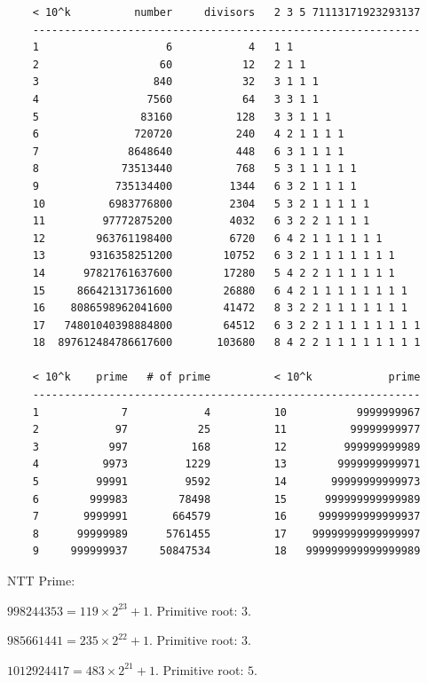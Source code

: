 \begin{verbatim}
	< 10^k          number     divisors   2 3 5 71113171923293137
	-------------------------------------------------------------
	1                    6            4   1 1
	2                   60           12   2 1 1
	3                  840           32   3 1 1 1
	4                 7560           64   3 3 1 1
	5                83160          128   3 3 1 1 1
	6               720720          240   4 2 1 1 1 1
	7              8648640          448   6 3 1 1 1 1
	8             73513440          768   5 3 1 1 1 1 1
	9            735134400         1344   6 3 2 1 1 1 1
	10          6983776800         2304   5 3 2 1 1 1 1 1
	11         97772875200         4032   6 3 2 2 1 1 1 1
	12        963761198400         6720   6 4 2 1 1 1 1 1 1
	13       9316358251200        10752   6 3 2 1 1 1 1 1 1 1
	14      97821761637600        17280   5 4 2 2 1 1 1 1 1 1
	15     866421317361600        26880   6 4 2 1 1 1 1 1 1 1 1
	16    8086598962041600        41472   8 3 2 2 1 1 1 1 1 1 1
	17   74801040398884800        64512   6 3 2 2 1 1 1 1 1 1 1 1
	18  897612484786617600       103680   8 4 2 2 1 1 1 1 1 1 1 1

	< 10^k    prime   # of prime          < 10^k            prime
	-------------------------------------------------------------
	1             7            4          10           9999999967
	2            97           25          11          99999999977
	3           997          168          12         999999999989
	4          9973         1229          13        9999999999971
	5         99991         9592          14       99999999999973
	6        999983        78498          15      999999999999989
	7       9999991       664579          16     9999999999999937
	8      99999989      5761455          17    99999999999999997
	9     999999937     50847534          18   999999999999999989
\end{verbatim}
NTT Prime:

$998244353 = 119 \times 2^{23} + 1$. Primitive root: $3$.

$985661441 = 235 \times 2^{22} + 1$. Primitive root: $3$.

$1012924417 = 483 \times 2^{21} + 1$. Primitive root: $5$.